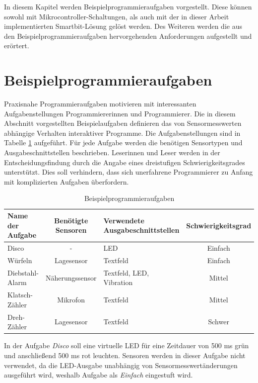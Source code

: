\documentclass[11pt,a4paper]{report}
\begin{document}
In diesem Kapitel werden Beispielprogrammieraufgaben vorgestellt.
Diese können sowohl mit Mikrocontroller-Schaltungen, als auch mit der in dieser Arbeit implementierten Smartbit-Lösung gelöst werden.
Des Weiteren werden die aus den Beispielprogrammieraufgaben hervorgehenden Anforderungen aufgestellt und erörtert.

\section{Beispielprogrammieraufgaben}\label{sec:activities}
Praxisnahe Programmieraufgaben motivieren mit interessanten Aufgabenstellungen Programmiererinnen und Programmierer.
Die in diesem Abschnitt vorgestellten Beispielaufgaben definieren das von Sensormesswerten abhängige Verhalten interaktiver Programme.
Die Aufgabenstellungen sind in Tabelle \ref{tab:excercises} aufgeführt.
Für jede Aufgabe werden die benötigen Sensortypen und Ausgabeschnittstellen beschrieben.
Leserinnen und Leser werden in der Entscheidungsfindung durch die Angabe eines dreistufigen Schwierigkeitsgrades unterstützt.
Dies soll verhindern, dass sich unerfahrene Programmierer zu Anfang mit komplizierten Aufgaben überfordern.
\begin{table}[htbp]
  \centering
  \begin{tabular}{|l|c|p{2.3cm}|c|}
      \hline
      \textbf{Name der Aufgabe} & \textbf{Benötigte Sensoren} & \textbf{Verwendete Ausgabeschnittstellen} & \textbf{Schwierigkeitsgrad} \\
      \hline
      Disco & - & LED & Einfach \\
      \hline
      Würfeln & Lagesensor & Textfeld & Einfach \\
      \hline
      Diebstahl-Alarm & Näherungssensor & Textfeld, LED, Vibration & Mittel \\
      \hline
      Klatsch-Zähler & Mikrofon & Textfeld & Mittel \\
      \hline
      Dreh-Zähler & Lagesensor & Textfeld & Schwer \\
      \hline
  \end{tabular}
  \caption{Beispielprogrammieraufgaben}
  \label{tab:excercises}
\end{table}

In der Aufgabe \textit{Disco} soll eine virtuelle LED für eine Zeitdauer von 500 ms grün und anschließend 500 ms rot leuchten.
Sensoren werden in dieser Aufgabe nicht verwendet, da die LED-Ausgabe unabhängig von Sensormesswertänderungen ausgeführt wird, weshalb Aufgabe als \textit{Einfach} eingestuft wird.
\end{document}

